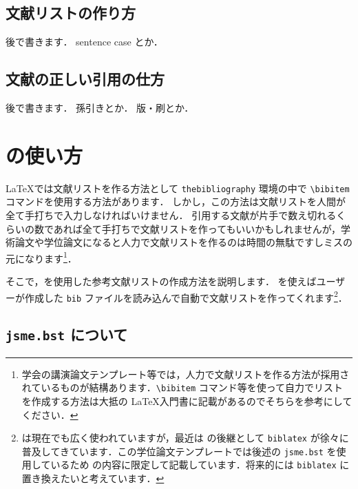 \subsection{文献リストの作り方}
\label{ssec:bib_list}


\begin{tcolorbox}
    後で書きます．
    sentence case とか．
\end{tcolorbox}


\subsection{文献の正しい引用の仕方}
\label{ssec:cite_correctly}

\begin{tcolorbox}
    後で書きます．
    孫引きとか．
    版・刷とか．
\end{tcolorbox}


\section{\BibTeX の使い方}
\label{sec:howtouse_bibtex}

\LaTeX では文献リストを作る方法として \verb|thebibliography| 環境の中で \verb|\bibitem| コマンドを使用する方法があります．
しかし，この方法は文献リストを人間が全て手打ちで入力しなければいけません．
引用する文献が片手で数え切れるくらいの数であれば全て手打ちで文献リストを作ってもいいかもしれませんが，学術論文や学位論文になると人力で文献リストを作るのは時間の無駄ですしミスの元になります\footnote{学会の講演論文テンプレート等では，人力で文献リストを作る方法が採用されているものが結構あります．\texttt{\textbackslash bibitem} コマンド等を使って自力でリストを作成する方法は大抵の \LaTeX 入門書に記載があるのでそちらを参考にしてください．}．

そこで，\BibTeX を使用した参考文献リストの作成方法を説明します．
\BibTeX を使えばユーザーが作成した \verb|bib| ファイルを読み込んで自動で文献リストを作ってくれます\footnote{\BibTeX は現在でも広く使われていますが，最近は \BibTeX の後継として \texttt{biblatex} が徐々に普及してきています．この学位論文テンプレートでは後述の \texttt{jsme.bst} を使用しているため \BibTeX の内容に限定して記載しています．将来的には \texttt{biblatex} に置き換えたいと考えています．}．

\subsection{\texttt{jsme.bst} について}
\label{ssec:jsme-bst}

